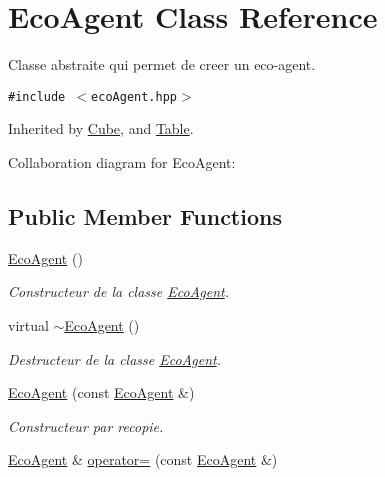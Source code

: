 \hypertarget{classEcoAgent}{
\section{EcoAgent Class Reference}
\label{classEcoAgent}
}
Classe abstraite qui permet de creer un eco-agent.  


{\tt \#include $<$ecoAgent.hpp$>$}

Inherited by \hyperlink{classCube}{Cube}, and \hyperlink{classTable}{Table}.

Collaboration diagram for EcoAgent:\subsection*{Public Member Functions}
\begin{CompactItemize}
\item 
\hyperlink{classEcoAgent_a0d07e98fbbb24b69a7d5d7fc0a75d2b}{EcoAgent} ()
\begin{CompactList}\small\item\em Constructeur de la classe \hyperlink{classEcoAgent}{EcoAgent}. \item\end{CompactList}\item 
\hypertarget{classEcoAgent_9443554bf734013cf26ff34d6bee4bbf}{
virtual \hyperlink{classEcoAgent_9443554bf734013cf26ff34d6bee4bbf}{$\sim$EcoAgent} ()}
\label{classEcoAgent_9443554bf734013cf26ff34d6bee4bbf}

\begin{CompactList}\small\item\em Destructeur de la classe \hyperlink{classEcoAgent}{EcoAgent}. \item\end{CompactList}\item 
\hypertarget{classEcoAgent_d23940f739177796c197575c4462790e}{
\hyperlink{classEcoAgent_d23940f739177796c197575c4462790e}{EcoAgent} (const \hyperlink{classEcoAgent}{EcoAgent} \&)}
\label{classEcoAgent_d23940f739177796c197575c4462790e}

\begin{CompactList}\small\item\em Constructeur par recopie. \item\end{CompactList}\item 
\hypertarget{classEcoAgent_55bb90fcd44c6545335056be7814e374}{
\hyperlink{classEcoAgent}{EcoAgent} \& \hyperlink{classEcoAgent_55bb90fcd44c6545335056be7814e374}{operator=} (const \hyperlink{classEcoAgent}{EcoAgent} \&)}
\label{classEcoAgent_55bb90fcd44c6545335056be7814e374}


\end{CompactItemize}
